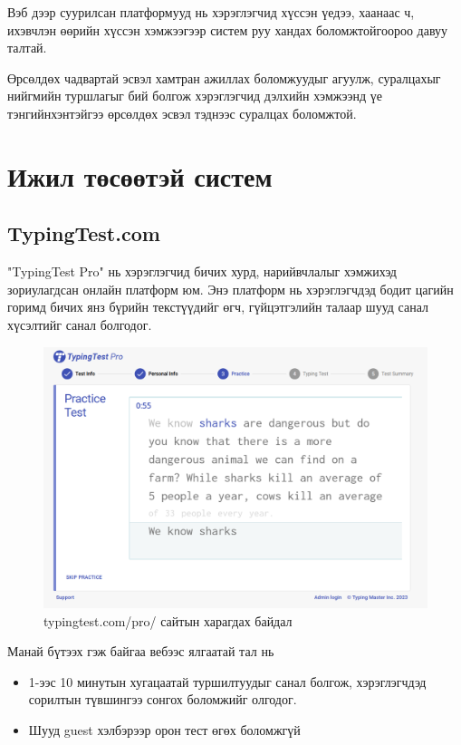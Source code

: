Вэб дээр суурилсан платформууд нь хэрэглэгчид хүссэн үедээ, хаанаас ч, ихэвчлэн өөрийн хүссэн хэмжээгээр систем руу хандах боломжтойгоороо давуу талтай.

Өрсөлдөх чадвартай эсвэл хамтран ажиллах боломжуудыг агуулж, суралцахыг нийгмийн туршлагыг бий болгож хэрэглэгчид дэлхийн хэмжээнд үе тэнгийнхэнтэйгээ өрсөлдөх эсвэл тэднээс суралцах боломжтой.
\section{Ижил төсөөтэй систем}

\subsection{TypingTest.com}

"TypingTest Pro" нь хэрэглэгчид бичих хурд, нарийвчлалыг хэмжихэд зориулагдсан онлайн платформ юм. Энэ платформ нь хэрэглэгчдэд бодит цагийн горимд бичих янз бүрийн текстүүдийг өгч, гүйцэтгэлийн талаар шууд санал хүсэлтийг санал болгодог.

\begin{figure}[h]
	\centering
	\includegraphics[width=15cm]{images/typingtestpro.png}
	\caption{typingtest.com/pro/ сайтын харагдах байдал}
	\label{fig:alltop}
\end{figure}

Манай бүтээх гэж байгаа вебээс ялгаатай тал нь
\begin{itemize}
	\item 1-ээс 10 минутын хугацаатай туршилтуудыг санал болгож, хэрэглэгчдэд сорилтын түвшингээ сонгох боломжийг олгодог.
	\item Шууд guest хэлбэрээр орон тест өгөх боломжгүй
\end{itemize}

